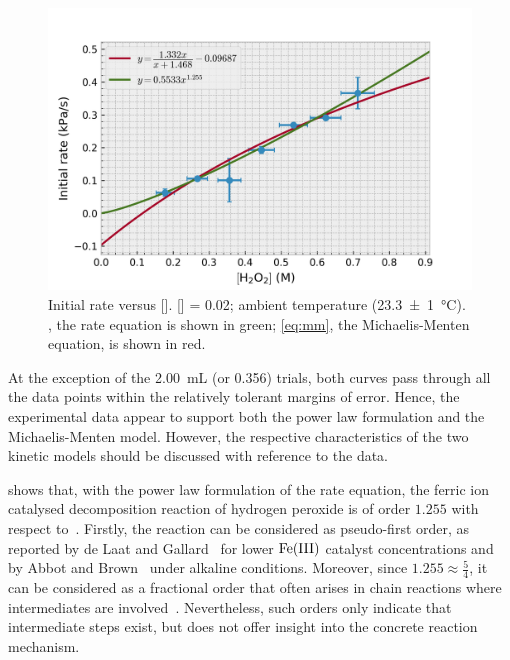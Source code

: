 \documentclass[a4paper, 12pt]{article}
\begin{document}
\begin{figure}[H]
    \centering
    \includegraphics[width=\textwidth]{data/processed_data}
    \caption{Initial rate versus []. [] = \SI{0.02}{\molar}; ambient temperature (\SI{23.3(10)}{\celsius}). , the rate equation is shown in green; \cref{eq:mm}, the Michaelis-Menten equation, is shown in red. }
    \label{fig:processed-data}
\end{figure}

At the exception of the \SI{2.00}{\mL} (or \SI{0.356}{\molar})  trials, both curves pass through all the data points within the relatively tolerant margins of error. Hence, the experimental data appear to support both the power law formulation and the Michaelis-Menten model. However, the respective characteristics of the two kinetic models should be discussed with reference to the data.

 shows that, with the power law formulation of the rate equation, the ferric ion catalysed decomposition reaction of hydrogen peroxide is of order $1.255$ with respect to~. Firstly, the reaction can be considered as pseudo-first order, as reported by de Laat and Gallard~\cite{de_laat} for lower $\ce{Fe(III)}$ catalyst concentrations and by Abbot and Brown~\cite{pseudo_first_order} under alkaline conditions. Moreover, since $1.255 \approx \frac{5}{4}$, it can be considered as a fractional order that often arises in chain reactions where intermediates are involved~\cite{atkins}. Nevertheless, such orders only indicate that intermediate steps exist, but does not offer insight into the concrete reaction mechanism.
\end{document}
